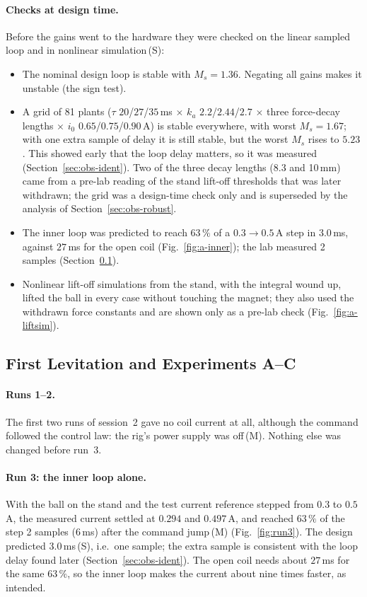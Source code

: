 \documentclass[11pt,a4paper]{article}
\newcommand{\st}[1]{\,\textup{(#1)}}
\begin{document}
\paragraph{Checks at design time.} Before the gains went to the hardware they were checked on the linear sampled loop and in
nonlinear simulation\st{S}:
\begin{itemize}
\item The nominal design loop is stable with $M_s = 1.36$. Negating all gains makes it unstable (the sign test).
\item A grid of 81 plants ($\tau$ $20$/$27$/$35$\,ms $\times$ $k_a$ $2.2$/$2.44$/$2.7$ $\times$ three force-decay lengths $\times$ $i_0$
      $0.65$/$0.75$/$0.90$\,A) is stable everywhere, with worst $M_s = 1.67$; with one extra sample of delay it is still stable,
      but the worst $M_s$ rises to $5.23$. This showed early that the loop delay matters, so it was measured (Section~\ref{sec:obs-ident}). Two of the three decay lengths (8.3 and 10\,mm) came from a pre-lab reading of the stand
      lift-off thresholds that was later withdrawn; the grid was a design-time check only and is superseded by the analysis of
      Section~\ref{sec:obs-robust}.
\item The inner loop was predicted to reach $63\,\%$ of a $0.3 \to 0.5$\,A step in $3.0$\,ms, against $27$\,ms for the open coil
      (Fig.~\ref{fig:a-inner}); the lab measured 2 samples (Section~\ref{sec:obs-first}).
\item Nonlinear lift-off simulations from the stand, with the integral wound up, lifted the ball in every case without
      touching the magnet; they also used the withdrawn force constants and are shown only as a pre-lab check
      (Fig.~\ref{fig:a-liftsim}).
\end{itemize}

\subsection{First Levitation and Experiments A--C}
\label{sec:obs-first}
\paragraph{Runs 1--2.} The first two runs of session~2 gave no coil current at all, although the command followed the
control law: the rig's power supply was off\st{M}. Nothing else was changed before run~3.

\paragraph{Run 3: the inner loop alone.} With the ball on the stand and the test current reference stepped from $0.3$ to
$0.5$\,A, the measured current settled at $0.294$ and $0.497$\,A, and reached $63\,\%$ of the step 2 samples ($6$\,ms) after
the command jump\st{M} (Fig.~\ref{fig:run3}). The design predicted $3.0$\,ms\st{S}, i.e.\ one sample; the extra sample is
consistent with the loop delay found later (Section~\ref{sec:obs-ident}). The open coil needs about $27$\,ms for the same
$63\,\%$, so the inner loop makes the current about nine times faster, as intended. 
\end{document}
